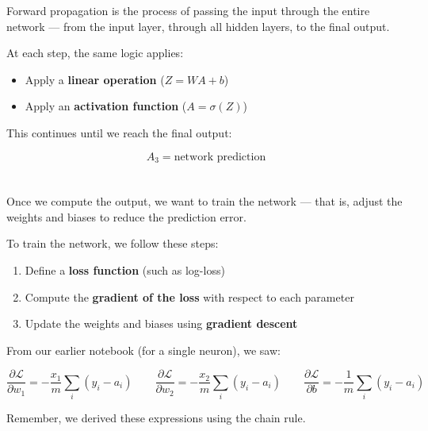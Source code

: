 \documentclass[11pt]{article}
\begin{document}
Forward propagation is the process of passing the input through the entire network —  
from the input layer, through all hidden layers, to the final output.

\vspace{0.5em}

At each step, the same logic applies:

\begin{itemize}
    \item Apply a \textbf{linear operation} ($Z = W A + b$)
    \item Apply an \textbf{activation function} ($A = \sigma(Z)$)
\end{itemize}

This continues until we reach the final output:

\[
A_3 = \text{network prediction}
\]

\vspace{2em}

\section*{}

Once we compute the output, we want to train the network —  
that is, adjust the weights and biases to reduce the prediction error.

\vspace{0.5em}

To train the network, we follow these steps:

\begin{enumerate}
    \item Define a \textbf{loss function} (such as log-loss)
    \item Compute the \textbf{gradient of the loss} with respect to each parameter
    \item Update the weights and biases using \textbf{gradient descent}
\end{enumerate}

\vspace{1em}

From our earlier notebook (for a single neuron), we saw:

\[
\frac{\partial \mathcal{L}}{\partial w_1} = -\frac{x_1}{m} \sum_i (y_i - a_i)
\quad\quad
\frac{\partial \mathcal{L}}{\partial w_2} = -\frac{x_2}{m} \sum_i (y_i - a_i)
\quad\quad
\frac{\partial \mathcal{L}}{\partial b} = -\frac{1}{m} \sum_i (y_i - a_i)
\]

Remember, we derived these expressions using the chain rule.
\end{document}

